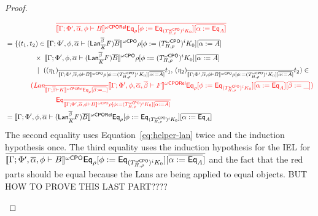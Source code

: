 \documentclass[acmsmall,review,anonymous]{acmart}
\theoremstyle{definition}
\begin{document}
\begin{proof}
\begin{itemize}
\begin{itemize}
{\begin{align*}
&{\color{red} \hspace*{1in}\overline{\llbracket{\Gamma; \Phi',
      \overline{\alpha},\phi \vdash B}\rrbracket^{{\omega\mathsf{CPORel}}}\mathsf{Eq}_\rho[\phi := \mathsf{Eq}_{(T^{\omega\mathsf{CPO}}_{H,\rho})^i
      K_0}][\overline{\alpha := \mathsf{Eq}_A}]}}\\
&= \{(t_1,t_2) \in \llbracket{\Gamma;\Phi',\phi,\overline{\alpha}
    \vdash (\mathsf{Lan}_{\overline{K}}^{\overline{\beta}} F)\overline{B}}\rrbracket^{{\omega\mathsf{CPO}}} \rho [\phi :=
    (T^{\omega\mathsf{CPO}}_{H,\rho})^i K_0] [\overline{\alpha := A}]\\
& \hspace*{0.57in}\times\;
  \llbracket{\Gamma;\Phi',\phi,\overline{\alpha} \vdash (\mathsf{Lan}_{\overline{K}}^{\overline{\beta}} F)\overline{B}}\rrbracket^{{\omega\mathsf{CPO}}} \rho [\phi := 
    (T^{\omega\mathsf{CPO}}_{H,\rho})^i K_0] [\overline{\alpha := A}]\\
& \hspace*{0.63in}|~\;((\eta_1)_{\overline{\llbracket{\Gamma;\Phi',\overline{\alpha},\phi 
      \vdash B}\rrbracket^{{\omega\mathsf{CPO}}}\rho [\phi := (T^{\omega\mathsf{CPO}}_{H,\rho})^i
      K_0][\overline{\alpha := A}]}} t_1,\,
  (\eta_2)_{\overline{\llbracket{\Gamma;\Phi',\overline{\alpha},\phi
      \vdash B}\rrbracket^{{\omega\mathsf{CPO}}}\rho [\phi := (T^{\omega\mathsf{CPO}}_{H,\rho})^i K_0]
    [\overline{\alpha := A}]}} t_2) \in\\ 
& \hspace*{0.5in}{\color{red} (\textit{Lan}_{\overline{\llbracket{\Gamma; \overline{\beta} 
        \vdash K}\rrbracket^{{\omega\mathsf{CPORel}}}\mathsf{Eq}_\rho[\overline{\beta := \_}]}}
  \llbracket{\Gamma; \Phi', \phi,\overline{\alpha},\overline{\beta} \vdash F}\rrbracket^{{\omega\mathsf{CPORel}}}\mathsf{Eq}_\rho[\phi
    := \mathsf{Eq}_{(T^{\omega\mathsf{CPO}}_{H,\rho})^i 
      K_0}][\overline{\alpha := \mathsf{Eq}_A}][\overline{\beta := \_}])}\\
&{\color{red} \hspace*{1in}\mathsf{Eq}_{\overline{\llbracket{\Gamma; \Phi',
      \overline{\alpha},\phi \vdash B}\rrbracket^{{\omega\mathsf{CPO}}}\rho[\phi := (T^{\omega\mathsf{CPO}}_{H,\rho})^i
      K_0][\overline{\alpha := A}]}}}\\
&=\llbracket{\Gamma;\Phi',\phi,\overline{\alpha}
    \vdash (\mathsf{Lan}_{\overline{K}}^{\overline{\beta}} F)\overline{B}}\rrbracket^{{\omega\mathsf{CPORel}}}  \mathsf{Eq}_{\rho} [\phi :=
   \mathsf{Eq}_{(T^{\omega\mathsf{CPO}}_{H,\rho})^i
      K_0}] [\overline{\alpha := \mathsf{Eq}_A}]
\end{align*}
The second equality uses Equation~\ref{eq:helper-lan} twice and the
induction hypothesis once. The third equality uses the induction
hypothesis for the IEL for $\overline{\llbracket{\Gamma; \Phi', \overline{\alpha},\phi
    \vdash B}\rrbracket^{{\omega\mathsf{CPO}}}\mathsf{Eq}_\rho[\phi := \mathsf{Eq}_{(T^{\omega\mathsf{CPO}}_{H,\rho})^i
      K_0}][\overline{\alpha := \mathsf{Eq}_A}]}$} {\color{red} and the fact that the
  red parts should be equal because the Lans are being applied to
  equal objects. BUT HOW TO PROVE THIS LAST PART????}



\end{itemize}
\end{itemize}
\end{proof}
\end{document}
